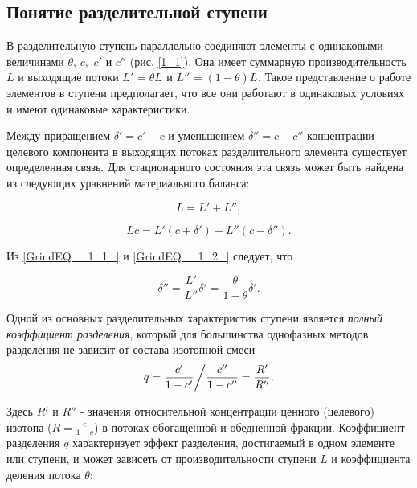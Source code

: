 \subsection{Понятие разделительной ступени}


В разделительную ступень параллельно соединяют элементы с одинаковыми величинами $\theta $, $c,$ $ $$c'$ и $c''$ (рис. \ref{1_1}). Она имеет суммарную производительность $L$ и выходящие потоки $L'_{} =\theta L_{}$ и $L''_{} =(1-\theta )L_{}$. Такое представление о работе элементов в ступени предполагает, что все они работают в одинаковых условиях и имеют одинаковые характеристики.

Между приращением $\delta '=c'-c$ и уменьшением $\delta ''=c-c''$ концентрации целевого компонента в выходящих потоках разделительного элемента существует определенная связь. Для стационарного состояния эта связь может быть найдена из следующих уравнений материального баланса:

\begin{equation} \label{GrindEQ__1_1_} 
L=L'+L'', 
\end{equation} 

\begin{equation} \label{GrindEQ__1_2_} 
Lc=L'(c+\delta ')+L''(c-\delta ''). 
\end{equation} 

Из \ref{GrindEQ__1_1_} и \ref{GrindEQ__1_2_} следует, что 

\begin{equation} \label{GrindEQ__1_3_} 
\delta ''=\frac{L'}{L''} \delta '=\frac{\theta }{1-\theta } \delta '. 
\end{equation} 

Одной из основных разделительных характеристик ступени является \textit{полный коэффициент разделения}, который для большинства однофазных методов разделения не зависит от состава изотопной смеси
\begin{equation} \label{GrindEQ__1_4_} 
q={\frac{c'}{1-c'}  \mathord{\left/{\vphantom{\frac{c'}{1-c'}  \frac{c''}{1-c''} =\frac{R'}{R''} }}\right.\kern-\nulldelimiterspace} \frac{c''}{1-c''} =\frac{R'}{R''} } .                              
\end{equation} 

Здесь $R'$ и $R''$ - значения относительной концентрации ценного (целевого) изотопа ($R=\frac{c}{1-c} $) в потоках обогащенной и обедненной фракции. Коэффициент разделения $q$ характеризует эффект разделения, достигаемый в одном элементе или ступени, и может зависеть от производительности ступени $L$ и коэффициента деления потока $\theta $:

